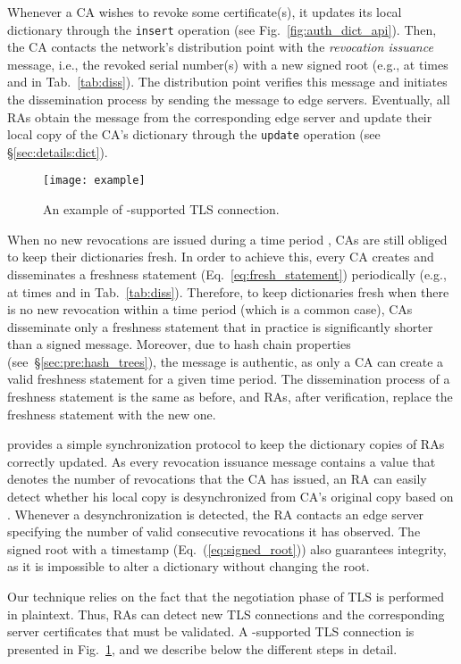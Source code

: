 Whenever a CA wishes to revoke some certificate(s), it updates its local
dictionary through the \texttt{insert} operation (see
Fig.~\ref{fig:auth_dict_api}). Then, the CA contacts the network's distribution
point with the \textit{revocation issuance} message, i.e., the revoked serial
number(s) with a new signed root (e.g., at times  and  in
Tab.~\ref{tab:diss}). The distribution point verifies this message and initiates
the dissemination process by sending the message to edge servers. Eventually,
all RAs obtain the message from the corresponding edge server and update their
local copy of the CA's dictionary through the \texttt{update} operation (see
\S\ref{sec:details:dict}).

\begin{figure}
    \centering
    \texttt{[image: example]}
    \caption{An example of \name-supported TLS connection.}\label{fig:example}
\end{figure}

When no new revocations are issued during a time period , CAs are still
obliged to keep their dictionaries fresh. In order to achieve this, every CA
creates and disseminates a freshness statement (Eq.~\ref{eq:fresh_statement})
periodically (e.g., at times  and  in
Tab.~\ref{tab:diss}). Therefore, to keep dictionaries fresh when there is no new
revocation within a time period  (which is a common case), CAs
disseminate only a freshness statement that in practice is significantly shorter
than a signed message.  Moreover, due to hash chain properties
(see~\S\ref{sec:pre:hash_trees}), the message is authentic, as only a CA can
create a valid freshness statement for a given time period. The dissemination
process of a freshness statement is the same as before, and RAs, after
verification, replace the freshness statement with the new one.

\name provides a simple synchronization protocol to keep the dictionary copies
of RAs correctly updated.  As every revocation issuance message contains a value
 that denotes the number of revocations that the CA has issued, an RA can
easily detect whether his local copy is desynchronized from CA's original copy
based on . Whenever a desynchronization is detected, the RA contacts an edge
server specifying the number of valid consecutive revocations it has observed.
The signed root with a timestamp (Eq.~(\ref{eq:signed_root})) also guarantees
integrity, as it is impossible to alter a dictionary without changing the root.

\label{sec:details:valid}
Our technique relies on the fact that the negotiation phase of TLS is performed
in plaintext. Thus, RAs can detect new TLS connections and the corresponding
server certificates that must be validated. A \name-supported TLS connection is
presented in Fig.~\ref{fig:example}, and we describe below the different steps
in detail.

